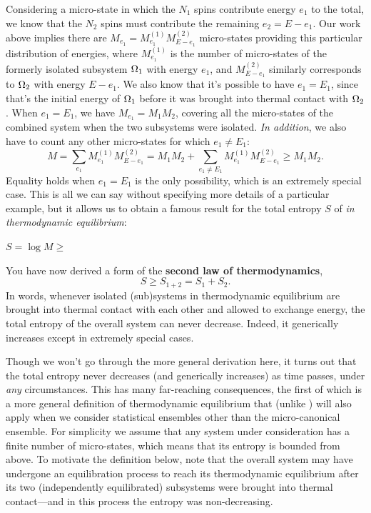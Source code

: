 Considering a micro-state in which the $N_1$ spins contribute energy $e_1$ to the total, we know that the $N_2$ spins must contribute the remaining $e_2 = E - e_1$.
Our work above implies there are $M_{e_1} = M_{e_1}^{(1)} M_{E - e_1}^{(2)}$ micro-states providing this particular distribution of energies, where $M_{e_1}^{(1)}$ is the number of micro-states of the formerly isolated subsystem $\Omega_1$ with energy $e_1$, and $M_{E - e_1}^{(2)}$ similarly corresponds to $\Omega_2$ with energy $E - e_1$.
We also know that it's possible to have $e_1 = E_1$, since that's the initial energy of $\Omega_1$ before it was brought into thermal contact with $\Omega_2$.
When $e_1 = E_1$, we have $M_{e_1} = M_1 M_2$, covering all the micro-states of the combined system when the two subsystems were isolated.
\textit{In addition}, we also have to count any other micro-states for which $e_1 \ne E_1$:
\begin{equation}
  \label{eq:micro_sum}
  M = \sum_{e_1} M_{e_1}^{(1)} M_{E - e_1}^{(2)} = M_1 M_2 + \sum_{e_1 \ne E_1} M_{e_1}^{(1)} M_{E - e_1}^{(2)} \geq M_1 M_2.
\end{equation}
Equality holds when $e_1 = E_1$ is the only possibility, which is an extremely special case.
This is all we can say without specifying more details of a particular example, but it allows us to obtain a famous result for the total entropy $S$ of \Om \textit{in thermodynamic equilibrium}:
\begin{mdframed}
  $S = \log M \geq $ \\[100 pt]
\end{mdframed}

\begin{shaded}
  You have now derived a form of the \textbf{second law of thermodynamics},
  \begin{equation*}
    S \geq S_{1 + 2} = S_1 + S_2.
  \end{equation*}
  In words, whenever isolated (sub)systems in thermodynamic equilibrium are brought into thermal contact with each other and allowed to exchange energy, the total entropy of the overall system can never decrease.
  Indeed, it generically increases except in extremely special cases.
\end{shaded}

Though we won't go through the more general derivation here, it turns out that the total entropy never decreases (and generically increases) as time passes, under \textit{any} circumstances.
This has many far-reaching consequences, the first of which is a more general definition of thermodynamic equilibrium that (unlike ) will also apply when we consider statistical ensembles other than the micro-canonical ensemble.
For simplicity we assume that any system under consideration has a finite number of micro-states, which means that its entropy is bounded from above.
To motivate the definition below, note that the overall system \Om may have undergone an equilibration process to reach its thermodynamic equilibrium after its two (independently equilibrated) subsystems were brought into thermal contact---and in this process the entropy was non-decreasing.

